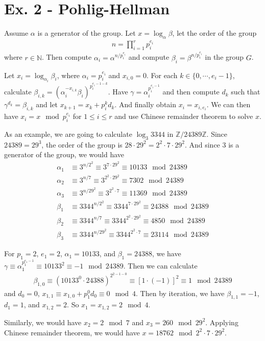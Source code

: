 \documentclass[11pt,a4paper]{article}
\begin{document}
\section*{Ex. 2 - Pohlig-Hellman}
\par Assume $\alpha$ is a generator of the group. Let $x = \log_{\alpha}\beta$, let the order of the group
\begin{align*}
	n = \prod_{i=1}^{r} p_{i}^{e_{i}}
\end{align*}
where $r \in \mathbb{N}$. Then compute $\alpha_{i} = \alpha^{n/p_{i}^{e_{i}}}$ and compute $\beta_{i} = \beta^{n/p_{i}^{e_{i}}}$ in the group $G$. 
\par Let $x_{i} = \log_{\alpha_{i}}\beta_{i}$, where $\alpha_{i} = p_{i}^{e_{i}}$ and $x_{i,0}=0$. For each $k \in \{0, \cdots, e_{i}-1\}$, calculate $\beta_{i,k} = (\alpha_{i}^{-x_{i,k}}\beta_{i})^{p_{i}^{e_{i}-1-k}}$.  Have $\gamma = \alpha_{i}^{p_{i}^{e_{i}-1}}$ and then compute $d_{k}$ such that $\gamma^{d_{k}} = \beta_{i,k}$ and let $x_{k+1} = x_{k} + p_{i}^{k}d_{k}$. And finally obtain $x_{i} = x_{i,e_{i}}$. We can then have $x_{i} = x \mod p_{i}^{e_{i}}$ for $1 \leq i \leq r$ and use Chinese remainder theorem to solve $x$.
\par As an example, we are going to calculate $\log_{3}3344$ in $\mathbb{Z}/24389\mathbb{Z}$. Since $24389 = 29^{3}$, the order of the group is $28\cdot 29^{2} = 2^{2}\cdot 7\cdot 29^{2}$. And since $3$ is a generator of the group, we would have
\begin{align*}
	\alpha_{1} &\equiv 3^{n/2^{2}} \equiv 3^{7\cdot 29^{2}} \equiv 10133 \mod 24389 \\
	\alpha_{2} &\equiv 3^{n/7} \equiv 3^{2^{2}\cdot 29^{2}} \equiv 7302 \mod 24389 \\
	\alpha_{3} &\equiv 3^{n/29^{2}} \equiv 3^{2^{2}\cdot 7} \equiv 11369 \mod 24389 \\
	\beta_{1} &\equiv 3344^{n/2^{2}} \equiv 3344^{7\cdot 29^{2}} \equiv 24388 \mod 24389 \\
	\beta_{2} &\equiv 3344^{n/7} \equiv 3344^{2^{2}\cdot 29^{2}} \equiv 4850 \mod 24389 \\
	\beta_{3} &\equiv 3344^{n/29^{2}} \equiv 3344^{2^{2}\cdot 7} \equiv 23114 \mod 24389
\end{align*}
\par For $p_{1} = 2$, $e_{1} = 2$, $\alpha_{1} = 10133$, and $\beta_{1} = 24388$, we have $\gamma \equiv \alpha_{1}^{p_{1}^{e_{1}-1}} \equiv 10133^{2} \equiv -1 \mod 24389$. Then we can calculate
\begin{align*}
	\beta_{1,0} \equiv (10133^{0}\cdot 24388)^{2^{2-1-0}} \equiv [1\cdot (-1)]^{2} \equiv 1 \mod 24389
\end{align*}
and $d_{0} = 0$, $x_{1,1} \equiv x_{1,0} + p_{1}^{0}d_{0} \equiv 0 \mod 4$. Then by iteration, we have $\beta_{1,1} = -1$, $d_{1} = 1$, and $x_{1,2} = 2$. So $x_{1} = x_{1,2} = 2 \mod 4$.
\par Similarly, we would have $x_{2} = 2 \mod 7$ and $x_{3} = 260 \mod 29^{2}$. Applying Chinese remainder theorem, we would have $x = 18762 \mod 2^{2}\cdot 7\cdot 29^{2}$.
\end{document}
